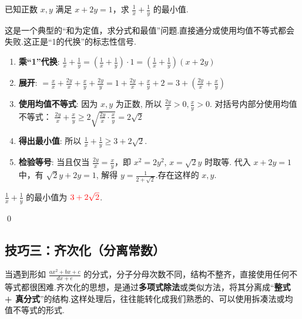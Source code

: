 \begin{exercise}
	已知正数 $x,y$ 满足 $x+2y=1$，求 $\frac{1}{x} + \frac{1}{y}$ 的最小值.
\end{exercise}
\begin{solution}
	\textcolor{green!50!black}{这是一个典型的“和为定值，求分式和最值”问题.直接通分或使用均值不等式都会失败.这正是“1的代换”的标志性信号.}
	\begin{enumerate}
		\item \textbf{乘“1”代换}:
		$\frac{1}{x} + \frac{1}{y} = \left( \frac{1}{x} + \frac{1}{y} \right) \cdot 1 = \left( \frac{1}{x} + \frac{1}{y} \right) (x+2y)$
		
		\item \textbf{展开}:
		$= \frac{x}{x} + \frac{2y}{x} + \frac{x}{y} + \frac{2y}{y} = 1 + \frac{2y}{x} + \frac{x}{y} + 2 = 3 + \left( \frac{2y}{x} + \frac{x}{y} \right)$
		
		\item \textbf{使用均值不等式}:
		因为 $x,y$ 为正数, 所以 $\frac{2y}{x} > 0, \frac{x}{y} > 0$.
		对括号内部分使用均值不等式：
		$\frac{2y}{x} + \frac{x}{y} \ge 2\sqrt{\frac{2y}{x} \cdot \frac{x}{y}} = 2\sqrt{2}$
		
		\item \textbf{得出最小值}:
		所以 $\frac{1}{x} + \frac{1}{y} \ge 3 + 2\sqrt{2}$.
		
		\item \textbf{检验等号}:
		当且仅当 $\frac{2y}{x} = \frac{x}{y}$，即 $x^2 = 2y^2$, $x = \sqrt{2}y$ 时取等.
		代入 $x+2y=1$ 中，有 $\sqrt{2}y+2y=1$, 解得 $y = \frac{1}{2+\sqrt{2}}$.存在这样的 $x,y$.
	\end{enumerate}
	$\frac{1}{x} + \frac{1}{y}$ 的最小值为 $\textcolor{red}{3 + 2\sqrt{2}}$.
\end{solution}
\qed

\subsection{技巧三：齐次化（分离常数）}
当遇到形如 $\frac{ax^2+bx+c}{dx+e}$ 的分式，分子分母次数不同，结构不整齐，直接使用任何不等式都很困难.齐次化的思想，是通过\textbf{多项式除法}或类似方法，将其分离成“\textbf{整式 + 真分式}”的结构.这样处理后，往往能转化成我们熟悉的、可以使用拆凑法或均值不等式的形式.

